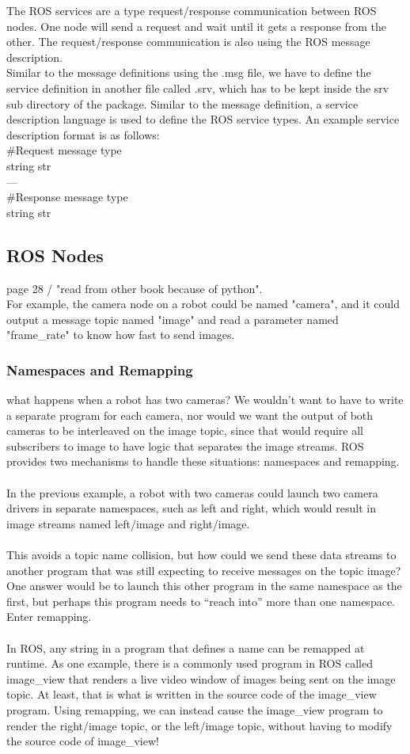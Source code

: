 \documentclass[•]{article}
\begin{document}
The ROS services are a type request/response communication between ROS nodes. One node will send a request and wait until it gets a response from the other. The request/response communication is also using the ROS message description.\\
Similar to the message definitions using the .msg file, we have to define the service definition in another file called .srv, which has to be kept inside the srv sub directory of the package. Similar to the message definition, a service description language is used to define the ROS service types.
An example service description format is as follows:\\
\vspace{2mm}
\#Request message type\\
string str\\
---\\
\#Response message type\\
string str


\subsection{ROS Nodes}
page 28 / "read from other book because of python".\\
For example, the camera node on a robot could be named "camera", and it could output a message topic named "image" and read a parameter named "frame_rate" to know how fast to send images.\\
\subsubsection{Namespaces and Remapping}
what happens when a robot has two cameras? We wouldn’t want
to have to write a separate program for each camera, nor would we want the output of both cameras to be interleaved on the image topic, since that would require all subscribers to image to have logic that separates the image streams. ROS provides two mechanisms to handle these situations: namespaces and remapping.\\
\\In the previous example, a robot with two cameras could launch two camera drivers in separate namespaces, such as left and right, which would result in image streams named left/image and right/image.\\
\\This avoids a topic name collision, but how could we send these data streams to another program that was still expecting to receive messages on the topic image? One answer would be to launch this other program in the same namespace as the first, but perhaps this program needs to “reach into” more than one namespace. Enter
remapping.\\
\\In ROS, any string in a program that defines a name can be remapped at runtime. As one example, there is a commonly used program in ROS called image_view that renders a live video window of images being sent on the image topic. At least, that is what is written in the source code of the image_view program. Using remapping, we can instead cause the image_view program to render the right/image topic, or the left/image topic, without having to modify the source code of image_view!
\end{document}
